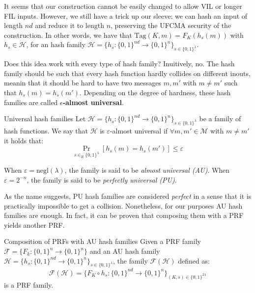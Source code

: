 \documentclass[a4paper, 12pt]{report}
\begin{document}
    It seems that our construction cannot be easily changed to allow VIL or longer FIL inputs. However, we still have a trick up our sleeve: we can hash an input of length $nd$ and reduce it to length $n$, preserving the UFCMA security of the construction. In other words, we have that $\mathrm{Tag}(K,m) = F_K(h_s(m))$ with $h_s \in \mathcal{H}$, for an hash family $\mathcal{H} = \{h_s : \{0,1\}^{nd} \to \{0,1\}^n\}_{s \in \{0,1\}^\lambda}$.

    Does this idea work with every type of hash family? Inuitively, no. The hash family should be such that every hash function hardly collides on different inouts, meanin that it should be hard to have two messages $m, m'$ with $m \neq m'$ such that $h_s(m) = h_s(m')$. Depending on the degree of hardness, these hash families are called \textbf{$\epsilon$-almost universal}.

    \begin{frameddefn}{Universal hash families}
        Let $\mathcal{H} = \{h_s : \{0,1\}^{nd} \to \{0,1\}^n\}_{s \in \{0,1\}^\lambda}$ be a family of hash functions. We say that $\mathcal{H}$ is $\varepsilon$-almost universal if $\forall m,m' \in \mathcal{M}$ with $m \neq m'$ it holds that:
        \[\Pr_{s \in_R \{0,1\}^\lambda} [h_s(m) = h_s(m')] \leq \varepsilon\]
        
        When $\varepsilon = \mathrm{negl}(\lambda)$, the family is said to be \textit{almost universal (AU)}. When $\varepsilon = 2^{-n}$, the family is said to be \textit{perfectly universal (PU)}.
    \end{frameddefn}

    As the name suggests, PU hash families are considered \textit{perfect} in a sense that it is practically impossible to get a collision. Nonetheless, for our purposes AU hash families are enough. In fact, it can be proven that composing them with a PRF yields another PRF.

    \begin{framedthm}[label={prf_au}]{Composition of PRFs with AU hash families}
        Given a PRF family $\mathcal{F} = \{F_k : \{0,1\}^n \to \{0,1\}^n\}$ and an AU hash family  $\mathcal{H} = \{h_s : \{0,1\}^{nd} \to \{0,1\}^n\}_{s \in \{0,1\}^\lambda}$, the family $\mathcal{F}(\mathcal{H})$ defined as:
        \[\mathcal{F}(\mathcal{H}) = \{F_K \circ h_s : \{0,1\}^{nd} \to \{0,1\}^n\}_{(K,s) \in \{0,1\}^{2\lambda}}\]
        is a PRF family.
    \end{framedthm}
\end{document}
